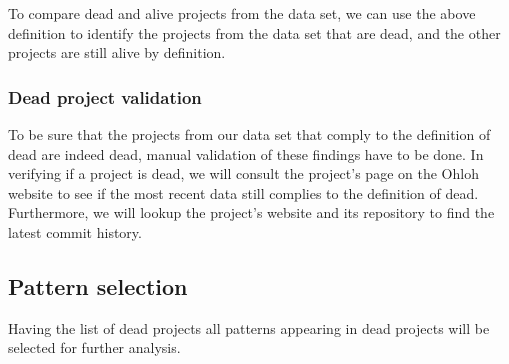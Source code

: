 To compare dead and alive projects from the data set, we can use the above
definition to identify the projects from the data set that are dead, and the
other projects are still alive by definition.

\subsubsection{Dead project validation}
To be sure that the projects from our data set that comply to the definition of
dead are indeed dead, manual validation of these findings have to be done.
In verifying if a project is dead, we will consult the project's page on the
Ohloh website to see if the most recent data still complies to the definition of
dead. Furthermore, we will lookup the project's website and its repository to
find the latest commit history.

\subsection{Pattern selection}
Having the list of dead projects all patterns appearing in dead projects will be
selected for further analysis.

\begin{comment}
This section describes the methods used to answer the research questions. A
good structure of this section often follows the sub questions by providing a
method for each.

The research method can be based on the “Scientific method”, but more creative
solutions could be defined as well. In any case, the method needs a thorough
motivation grounded in theory in order to be acceptable.

As part of the method a number of hypotheses are described. These hypotheses
will be tested by the research, using the methods described here.

An important part of this section is validation. How will you evaluate and
validate the outcomes of the research? You can look at Paul Klint’s homepage
for examples of this section as
well\footnote{http://homepages.cwi.nl/~paulk/thesesMasterSoftwareEngineering/2006/RichardKettelerij.pdf}.
\end{comment}